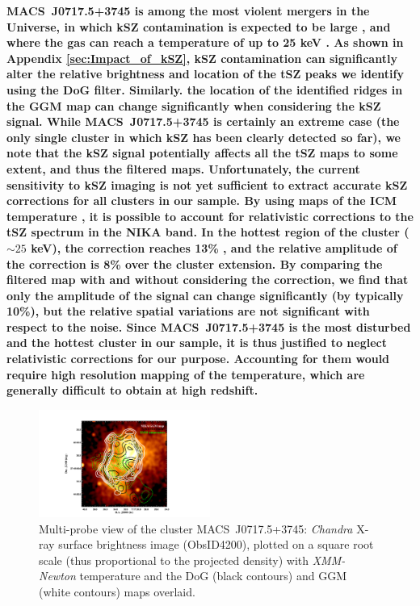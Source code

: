 \documentclass[twocolumn,traditabstract]{aa}
\begin{document}
{\bf \mbox{MACS~J0717.5+3745} is among the most violent mergers in the Universe, in which kSZ contamination is expected to be large \citep{Mroczkowski2012,Sayers2013,Adam2016b}, and where the gas can reach a temperature of up to 25 keV \citep[e.g.][]{Adam2017}. As shown in Appendix \ref{sec:Impact_of_kSZ}, kSZ contamination can significantly alter the relative brightness and location of the tSZ peaks we identify using the DoG filter. Similarly. the location of the identified ridges in the GGM map can change significantly when considering the kSZ signal. While \mbox{MACS~J0717.5+3745} is certainly an extreme case (the only single cluster in which kSZ has been clearly detected so far), we note that the kSZ signal potentially affects all the tSZ maps to some extent, and thus the filtered maps. Unfortunately, the current sensitivity to kSZ imaging is not yet sufficient to extract accurate kSZ corrections for all clusters in our sample. By using maps of the ICM temperature \citep[e.g.][]{Adam2017}, it is possible to account for relativistic corrections to the tSZ spectrum in the NIKA band. In the hottest region of the cluster ($\sim 25$ keV), the correction reaches 13\% \citep[see also Table 1 in][]{Adam2016b}, and the relative amplitude of the correction is 8\% over the cluster extension. By comparing the filtered map with and without considering the correction, we find that only the amplitude of the signal can change significantly (by typically 10\%), but the relative spatial variations are not significant with respect to the noise. Since \mbox{MACS~J0717.5+3745} is the most disturbed and the hottest cluster in our sample, it is thus justified to neglect relativistic corrections for our purpose. Accounting for them would require high resolution mapping of the temperature, which are generally difficult to obtain at high redshift.}

\begin{figure}[h]
\center
\includegraphics[trim=5cm 0cm 8cm 2cm, clip=true, width=0.5\textwidth]{Figure/MACSJ0717_multiL.pdf} 
\caption{\footnotesize{Multi-probe view of the cluster \mbox{MACS~J0717.5+3745}: \textit{Chandra} X-ray surface brightness image (ObsID4200), plotted on a square root scale (thus proportional to the projected density) with \textit{XMM-Newton} temperature \citep[green contours from][]{Adam2017} and the DoG (black contours) and GGM (white contours) maps overlaid.}}
\label{fig:MACSJ0717_multiL}
\end{figure}
\end{document}
